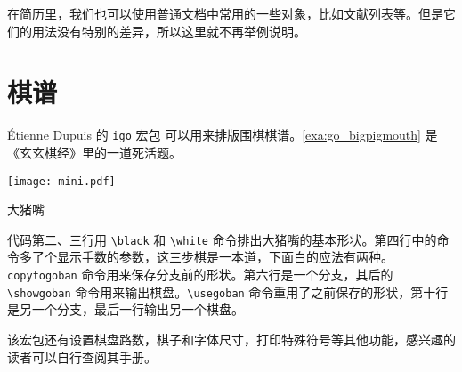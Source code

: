 在简历里，我们也可以使用普通文档中常用的一些对象，比如文献列表等。但是它们的用法没有特别的差异，所以这里就不再举例说明。

\section{棋谱}

Étienne Dupuis \indexDupuis 的 \texttt{igo} 宏包 \citep{Dupuis_2006} 可以用来排版围棋棋谱。\autoref{exa:go_bigpigmouth} 是《玄玄棋经》里的一道死活题。

\begin{example}[h]
\begin{FBTDemo}[numbers=left]{
\centering
\texttt{[image: mini.pdf]}
}
\usepackage{igo}
\showgoban
\quad
{}
\showgoban
\end{FBTDemo}
\caption{大猪嘴}
\label{exa:go_bigpigmouth}
\end{example}

代码第二、三行用 \verb|\black| 和 \verb|\white| 命令排出大猪嘴的基本形状。第四行中的命令多了个显示手数的参数，这三步棋是一本道，下面白的应法有两种。\verb|copytogoban| 命令用来保存分支前的形状。第六行是一个分支，其后的 \verb|\showgoban| 命令用来输出棋盘。\verb|\usegoban| 命令重用了之前保存的形状，第十行是另一个分支，最后一行输出另一个棋盘。

该宏包还有设置棋盘路数，棋子和字体尺寸，打印特殊符号等其他功能，感兴趣的读者可以自行查阅其手册。



